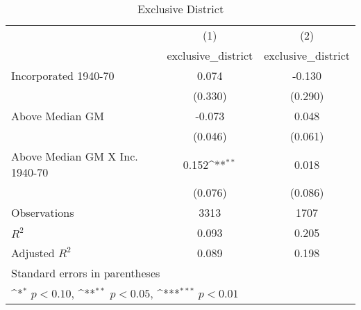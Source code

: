 \begin{table}[htbp]\centering
\def\sym#1{\ifmmode^{#1}\else\(^{#1}\)\fi}
\caption{Exclusive District}
\begin{tabular}{l*{2}{c}}
\hline\hline
                    &\multicolumn{1}{c}{(1)}&\multicolumn{1}{c}{(2)}\\
                    &\multicolumn{1}{c}{exclusive\_district}&\multicolumn{1}{c}{exclusive\_district}\\
\hline
Incorporated 1940-70&       0.074         &      -0.130         \\
                    &     (0.330)         &     (0.290)         \\
[1em]
Above Median GM     &      -0.073         &       0.048         \\
                    &     (0.046)         &     (0.061)         \\
[1em]
Above Median GM X Inc. 1940-70&       0.152\sym{**} &       0.018         \\
                    &     (0.076)         &     (0.086)         \\
\hline
Observations        &        3313         &        1707         \\
\(R^{2}\)           &       0.093         &       0.205         \\
Adjusted \(R^{2}\)  &       0.089         &       0.198         \\
\hline\hline
\multicolumn{3}{l}{\footnotesize Standard errors in parentheses}\\
\multicolumn{3}{l}{\footnotesize \sym{*} \(p<0.10\), \sym{**} \(p<0.05\), \sym{***} \(p<0.01\)}\\
\end{tabular}
\end{table}

